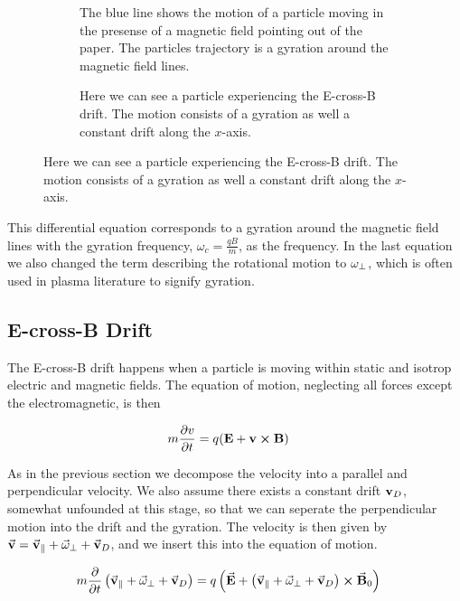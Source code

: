 		\begin{figure}
			\centering
			\begin{subfigure}{0.45\textwidth}
				
				\caption{The blue line shows the motion of a particle moving in the presense of a magnetic
				field pointing out of the paper. The particles trajectory is a gyration around the magnetic field lines.}
			\end{subfigure}
			\begin{subfigure}{0.45\textwidth}
				\caption{Here we can see a particle experiencing the E-cross-B drift. The motion consists of a gyration
				as well a constant drift along the \(x\)-axis.}
			\end{subfigure}
		\end{figure}


		This differential equation corresponds to a gyration around the magnetic field lines
		with the gyration frequency, \(\omega_c = \frac{qB}{m}\), as the frequency.
		In the last equation we also changed the term describing the rotational motion
		to \(\vb{\omega}_\perp\), which is often used in plasma literature to
		signify gyration.

	\subsection{E-cross-B Drift}
	The E-cross-B drift happens when a particle is moving within static and isotrop
	electric and magnetic fields. The equation of motion, neglecting all forces
	except the electromagnetic, is then

	\begin{align}
		m\pdv{v}{t} &= q(\vb{E} + \vb{v}\cross\vb{B}) \label{eq:EcrossB}
	\end{align}

	As in the previous section we decompose the velocity into a parallel and perpendicular
 	velocity. We also assume there exists a constant drift \(\vb{v}_D\), somewhat unfounded at this stage,
	so that we can seperate the perpendicular motion into the drift and the gyration.
	The velocity is then given by \(\va{v} = \va{v}_\parallel + \va{\omega}_\perp + \va{v}_D\),
	and we insert this into the equation of motion.

	\begin{align}
		m\pdv{}{t}\left( \va{v}_\parallel + \va{\omega}_\perp + \va{v}_D\right) &=
		q \left( \va{E} +   \left( \va{v}_\parallel + \va{\omega}_\perp +
		\va{v}_D \right)  \cross \va{B}_0 \right)
	\end{align}

